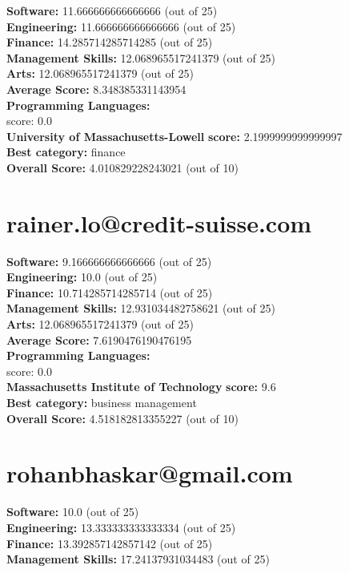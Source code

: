 \documentclass{article}
\begin{document}
\textbf{Software:} 11.666666666666666 (out of 25)\\
\textbf{Engineering: } 11.666666666666666 (out of 25)\\
\textbf{Finance:} 14.285714285714285 (out of 25)\\
\textbf{Management Skills:} 12.068965517241379 (out of 25)\\
\textbf{Arts:} 12.068965517241379 (out of 25)\\
\textbf{Average Score: } 8.348385331143954\\
\textbf{Programming Languages:} \\
score: 0.0\\
\textbf{University of Massachusetts-Lowell} \textbf{score:} 2.1999999999999997\\
\textbf{Best category: } finance\\
\textbf{Overall Score: }4.010829228243021 (out of 10)\section{rainer.lo@credit-suisse.com}
\textbf{Software:} 9.166666666666666 (out of 25)\\
\textbf{Engineering: } 10.0 (out of 25)\\
\textbf{Finance:} 10.714285714285714 (out of 25)\\
\textbf{Management Skills:} 12.931034482758621 (out of 25)\\
\textbf{Arts:} 12.068965517241379 (out of 25)\\
\textbf{Average Score: } 7.6190476190476195\\
\textbf{Programming Languages:} \\
score: 0.0\\
\textbf{Massachusetts Institute of Technology} \textbf{score:} 9.6\\
\textbf{Best category: } business management\\
\textbf{Overall Score: }4.518182813355227 (out of 10)\section{rohanbhaskar@gmail.com}
\textbf{Software:} 10.0 (out of 25)\\
\textbf{Engineering: } 13.333333333333334 (out of 25)\\
\textbf{Finance:} 13.392857142857142 (out of 25)\\
\textbf{Management Skills:} 17.24137931034483 (out of 25)\\
\end{document}

